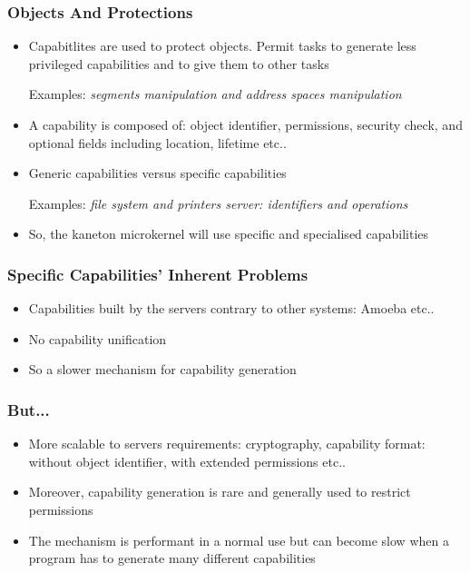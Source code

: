 \documentclass[8pt]{beamer}
\newcommand{\nl}[0]{\vspace{0.4cm}}
\begin{document}

\begin{frame}
  \frametitle{Objects And Protections}

  \begin{itemize}[<+->]
    \item
      Capabitlites are used to protect objects. Permit tasks to generate
      less privileged capabilities and to give them to other tasks

      \nl

      Examples: \textit{segments manipulation and address spaces manipulation}
    \item
      A capability is composed of: object identifier, permissions,
      security check, and optional fields including location, lifetime
      etc..
    \item
      Generic capabilities versus \alert{specific} capabilities

      \nl

      Examples: \textit{file system and printers server: identifiers
        and operations}
    \item
      So, the kaneton microkernel will use specific and specialised
      capabilities
  \end{itemize}
\end{frame}


\begin{frame}
  \frametitle{Specific Capabilities' Inherent Problems}

  \begin{itemize}[<+->]
    \item
      Capabilities built by the servers contrary to other systems:
      Amoeba etc..
    \item
      No capability unification
    \item
      So a slower mechanism for capability generation
  \end{itemize}
\end{frame}


\begin{frame}
  \frametitle{But...}

  \begin{itemize}[<+->]
    \item
      More scalable to servers requirements: cryptography,
      capability format: without object identifier, with extended
      permissions etc..
    \item
      Moreover, capability generation is rare and generally used
      to restrict permissions
    \item
      The mechanism is performant in a normal use but can become
      slow when a program has to generate many different capabilities
  \end{itemize}
\end{frame}
\end{document}
